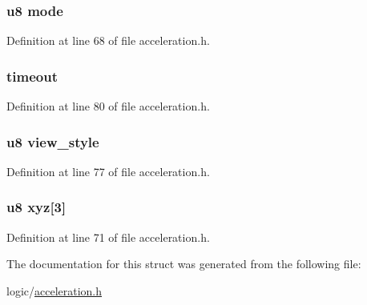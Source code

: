 \hypertarget{structaccel_a7cea6ae40aa46b41e3806213a39718c6}{
\subsubsection[{mode}]{\setlength{\rightskip}{0pt plus 5cm}u8 {\bf mode}}}\label{structaccel_a7cea6ae40aa46b41e3806213a39718c6}


\-Definition at line 68 of file acceleration.\-h.

\hypertarget{structaccel_a735bf6536b07682f96c9417b0f1e9079}{
\subsubsection[{timeout}]{ {\bf timeout}}}\label{structaccel_a735bf6536b07682f96c9417b0f1e9079}


\-Definition at line 80 of file acceleration.\-h.

\hypertarget{structaccel_a12daf57ef9d0a0b0e764ac25f7f4f536}{
\subsubsection[{view\-\_\-style}]{\setlength{\rightskip}{0pt plus 5cm}u8 {\bf view\-\_\-style}}}\label{structaccel_a12daf57ef9d0a0b0e764ac25f7f4f536}


\-Definition at line 77 of file acceleration.\-h.

\hypertarget{structaccel_af9cba48daaf1e24eb2df884547c0efcc}{
\subsubsection[{xyz}]{\setlength{\rightskip}{0pt plus 5cm}u8 {\bf xyz}\mbox{[}3\mbox{]}}}\label{structaccel_af9cba48daaf1e24eb2df884547c0efcc}


\-Definition at line 71 of file acceleration.\-h.



\-The documentation for this struct was generated from the following file\-:\begin{DoxyCompactItemize}
\item 
logic/\hyperlink{acceleration_8h}{acceleration.\-h}\end{DoxyCompactItemize}
